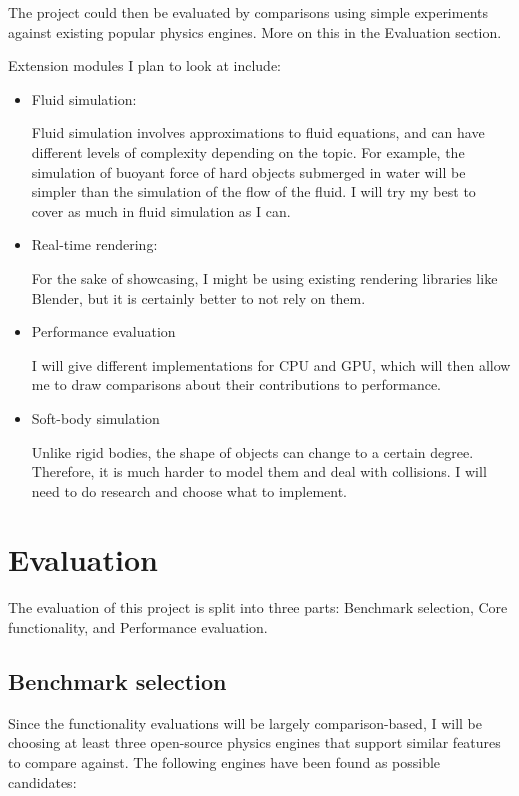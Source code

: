 \documentclass[12pt,a4paper,twoside]{article}
\begin{document}
The project could then be evaluated by comparisons using simple experiments against existing popular physics engines.
More on this in the Evaluation section.

Extension modules I plan to look at include:
\begin{itemize}
\item Fluid simulation:

Fluid simulation involves approximations to fluid equations, 
and can have different levels of complexity depending on the topic.
For example, 
the simulation of buoyant force of hard objects submerged in water will be simpler than 
the simulation of the flow of the fluid.
I will try my best to cover as much in fluid simulation as I can.

\item Real-time rendering:

For the sake of showcasing, I might be using existing rendering libraries like Blender\cite{blender}, 
but it is certainly better to not rely on them.

\item Performance evaluation

I will give different implementations for CPU and GPU, 
which will then allow me to draw comparisons about their contributions to performance.

\item Soft-body simulation

Unlike rigid bodies, the shape of objects can change to a certain degree.
Therefore, it is much harder to model them and deal with collisions.
I will need to do research and choose what to implement. 

\end{itemize}

\section*{Evaluation}

The evaluation of this project is split into three parts: Benchmark selection, Core functionality, and Performance evaluation.

\subsection*{Benchmark selection}

Since the functionality evaluations will be largely comparison-based,
I will be choosing at least three open-source physics engines that support similar features to compare against.
The following engines have been found as possible candidates:
\end{document}
